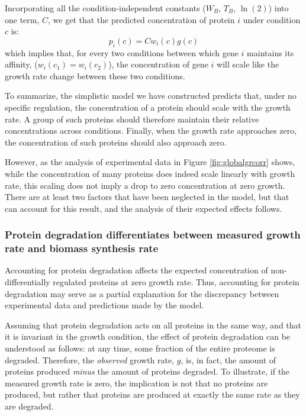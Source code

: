 \documentclass[notitlepage]{article}
\begin{document}
Incorporating all the condition-independent constants ($W_B$, $T_B$, $\ln(2)$) into one term, $C$, we get that the predicted concentration of protein $i$ under condition $c$ is:
\begin{equation}
  \label{eq:final-conc}
  p_i(c)=Cw_i(c)g(c)
\end{equation}
which implies that, for every two conditions between which gene $i$ maintains its affinity, ($w_i(c_1)=w_i(c_2)$), the concentration of gene $i$ will scale like the growth rate change between these two conditions.

To summarize, the simplistic model we have constructed predicts that, under no specific regulation, the concentration of a protein should scale with the growth rate.
A group of such proteins should therefore maintain their relative concentrations across conditions.
Finally, when the growth rate approaches zero, the concentration of such proteins should also approach zero.

However, as the analysis of experimental data in Figure \ref{fig:globalgrcorr} shows, while the concentration of many proteins does indeed scale linearly with growth rate, this scaling does not imply a drop to zero concentration at zero growth.
There are at least two factors that have been neglected in the model, but that can account for this result, and the analysis of their expected effects follows.

\subsubsection{Protein degradation differentiates between measured growth rate and biomass synthesis rate}
Accounting for protein degradation affects the expected concentration of non-differentially regulated proteins at zero growth rate.
Thus, accounting for protein degradation may serve as a partial explanation for the discrepancy between experimental data and predictions made by the model.

Assuming that protein degradation acts on all proteins in the same way, and that it is invariant in the growth condition, the effect of protein degradation can be understood as follows: at any time, some fraction of the entire proteome is degraded.
Therefore, the \emph{observed} growth rate, $g$, is, in fact, the amount of proteins produced \emph{minus} the amount of proteins degraded.
To illustrate, if the measured growth rate is zero, the implication is not that no proteins are produced, but rather that proteins are produced at exactly the same rate as they are degraded.
\end{document}
